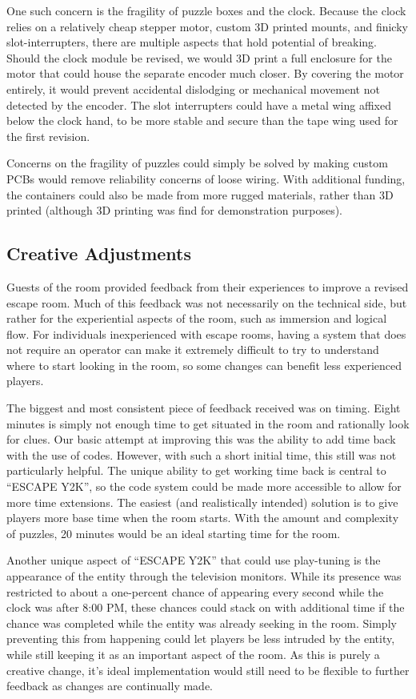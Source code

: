 \documentclass[conference]{IEEEtran}
\begin{document}
\indent One such concern is the fragility of puzzle boxes and the clock. Because the clock relies on a relatively cheap 
stepper motor, custom 3D printed mounts, and finicky slot-interrupters, there are multiple aspects that hold potential 
of breaking. Should the clock module be revised, we would 3D print a full enclosure for the motor that could house the 
separate encoder much closer. By covering the motor entirely, it would prevent accidental dislodging or mechanical 
movement not detected by the encoder. The slot interrupters could have a metal wing affixed below the clock hand, to be 
more stable and secure than the tape wing used for the first revision. 

\indent Concerns on the fragility of puzzles could simply be solved by making custom PCBs would remove reliability concerns 
of loose wiring. With additional funding, the containers could also be made from more rugged materials, rather than 3D 
printed (although 3D printing was find for demonstration purposes).

\subsection{Creative Adjustments}
Guests of the room provided feedback from their experiences to improve a revised escape room. Much of this feedback was 
not necessarily on the technical side, but rather for the experiential aspects of the room, such as immersion and logical 
flow. For individuals inexperienced with escape rooms, having a system that does not require an operator can make it extremely 
difficult to try to understand where to start looking in the room, so some changes can benefit less experienced players.

\indent The biggest and most consistent piece of feedback received was on timing. Eight minutes is simply not enough time to 
get situated in the room and rationally look for clues. Our basic attempt at improving this was the ability to add time back 
with the use of codes. However, with such a short initial time, this still was not particularly helpful. The unique ability 
to get working time back is central to ``ESCAPE Y2K'', so the code system could be made more accessible to allow for more time 
extensions. The easiest (and realistically intended) solution is to give players more base time when the room starts. With the 
amount and complexity of puzzles, 20 minutes would be an ideal starting time for the room.

\indent Another unique aspect of ``ESCAPE Y2K'' that could use play-tuning is the appearance of the entity through the television 
monitors. While its presence was restricted to about a one-percent chance of appearing every second while the clock was after 
8:00 PM, these chances could stack on with additional time if the chance was completed while the entity was already seeking in 
the room. Simply preventing this from happening could let players be less intruded by the entity, while still keeping it as an 
important aspect of the room. As this is purely a creative change, it's ideal implementation would still need to be flexible to 
further feedback as changes are continually made.
\end{document}
